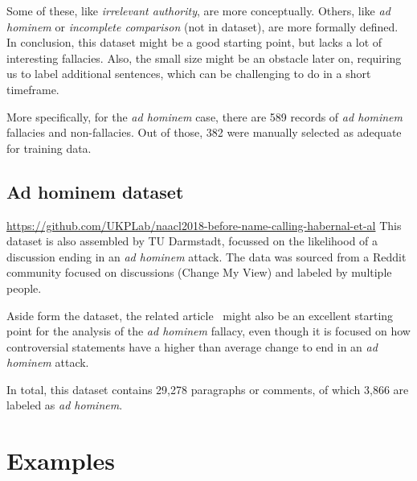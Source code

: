 \documentclass[a4paper]{article}
\begin{document}
Some of these, like \emph{irrelevant authority}, are more conceptually. Others, like \emph{ad hominem} or \emph{incomplete comparison} (not in dataset), are more formally defined. In conclusion, this dataset might be a good starting point, but lacks a lot of interesting fallacies. Also, the small size might be an obstacle later on, requiring us to label additional sentences, which can be challenging to do in a short timeframe. 

More specifically, for the \emph{ad hominem} case, there are 589 records of \emph{ad hominem} fallacies and non-fallacies. Out of those, 382 were manually selected as adequate for training data. 

\subsection{Ad hominem dataset~\cite{Habernal.et.al.2018.NAACL.adhominem}}
\url{https://github.com/UKPLab/naacl2018-before-name-calling-habernal-et-al}
This dataset is also assembled by TU Darmstadt, focussed on the likelihood of a discussion ending in an \emph{ad hominem} attack. The data was sourced from a Reddit community focused on discussions (Change My View) and labeled by multiple people.  

Aside form the dataset, the related article~\cite{Habernal.et.al.2018.NAACL.adhominem} might also be an excellent starting point for the analysis of the \emph{ad hominem} fallacy, even though it is focused on how controversial statements have a higher than average change to end in an \emph{ad hominem} attack.

In total, this dataset contains 29,278 paragraphs or comments, of which 3,866 are labeled as \emph{ad hominem}.


\section{Examples}
\end{document}

